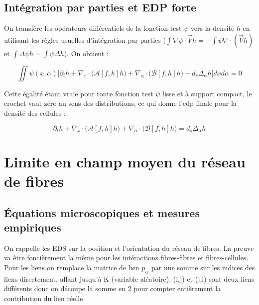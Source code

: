 \documentclass{article}
\begin{document}
\subsection{Intégration par parties et EDP forte}
On transfère les opérateurs différentiels de la fonction test $\psi$ vers la densité $h$ en utilisant les règles usuelles d'intégration par parties ($\int \nabla \psi \cdot \vec{V} h = - \int \psi \nabla \cdot (\vec{V} h)$ et $\int \Delta \psi h = \int \psi \Delta h$). On obtient :

\begin{equation*}
\iint \psi(x, \alpha) \bigg[ \partial_t h + \nabla_x \cdot \Big( \mathcal{A}[f,h] h \Big) + \nabla_\alpha \cdot \Big( \mathcal{B}[f,h] h \Big) - d_s \Delta_\alpha h \bigg] dx d\alpha = 0
\end{equation*}

Cette égalité étant vraie pour toute fonction test $\psi$ lisse et à support compact, le crochet vaut zéro au sens des distributions, ce qui donne l'edp finale pour la densité des cellules :

\begin{equation}
\partial_t h + \nabla_x \cdot \Big( \mathcal{A}[f,h] h \Big) + \nabla_\alpha \cdot \Big( \mathcal{B}[f,h] h \Big) = d_s \Delta_\alpha h
\end{equation}

\section{Limite en champ moyen du réseau de fibres}

\subsection{Équations microscopiques et mesures empiriques}
On rappelle les EDS sur la position et l'orientation du réseau de fibres. La preuve va être foncièrement la même pour les intéractions fibres-fibres et fibres-cellules. Pour les liens on remplace la matrice de lien $p_{ij}$ par une somme sur les indices des liens directement, allant jusqu'à K (variable aléatoire). (i,j) et (j,i) sont deux liens différents donc on découpe la somme en 2 pour compter entièrement la contribution du lien réelle.
\end{document}
